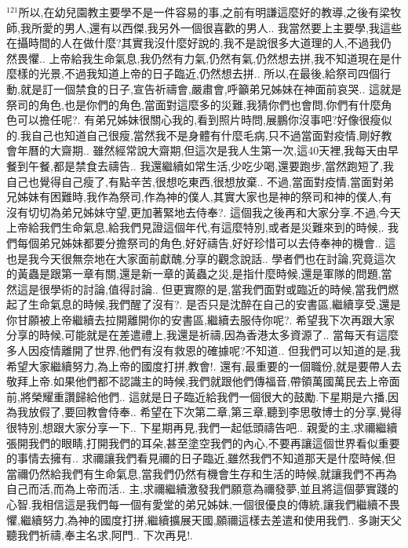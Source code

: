 \documentclass{book}
\begin{document}
$^{121}$所以,在幼兒園教主要學不是一件容易的事,之前有明謙這麼好的教導,之後有梁牧師,我所愛的男人,還有以西傑,我另外一個很喜歡的男人..
我當然要上主要學,我這些在攝時間的人在做什麼?其實我沒什麼好說的,我不是說很多大道理的人,不過我仍然畏懼..
上帝給我生命氣息,我仍然有力氣,仍然有氣,仍然想去拼,我不知道現在是什麼樣的光景,不過我知道上帝的日子臨近,仍然想去拼..
所以,在最後,給祭司四個行動,就是訂一個禁食的日子,宣告祈禱會,嚴肅會,呼籲弟兄姊妹在神面前哀哭..
這就是祭司的角色,也是你們的角色,當面對這麼多的災難,我猜你們也會問,你們有什麼角色可以擔任呢?.
有弟兄姊妹很關心我的,看到照片時問,展鵬你沒事吧?好像很瘦似的.我自己也知道自己很瘦,當然我不是身體有什麼毛病,只不過當面對疫情,剛好教會年曆的大齋期..
雖然經常說大齋期,但這次是我人生第一次,這40天裡,我每天由早餐到午餐,都是禁食去禱告..
我還繼續如常生活,少吃少喝,還要跑步,當然跑短了,我自己也覺得自己瘦了,有點辛苦,很想吃東西,很想放棄..
不過,當面對疫情,當面對弟兄姊妹有困難時,我作為祭司,作為神的僕人,其實大家也是神的祭司和神的僕人,有沒有切切為弟兄姊妹守望,更加著緊地去侍奉?.
這個我之後再和大家分享.不過,今天上帝給我們生命氣息,給我們見證這個年代,有這麼特別,或者是災難來到的時候,.
我們每個弟兄姊妹都要分擔祭司的角色,好好禱告,好好珍惜可以去侍奉神的機會..
這也是我今天很無奈地在大家面前獻醜,分享的觀念說話..
學者們也在討論,究竟這次的黃蟲是跟第一章有關,還是新一章的黃蟲之災,是指什麼時候,還是軍隊的問題,當然這是很學術的討論,值得討論..
但更實際的是,當我們面對或臨近的時候,當我們燃起了生命氣息的時候,我們醒了沒有?.
是否只是沈醉在自己的安書區,繼續享受,還是你甘願被上帝繼續去拉開離開你的安書區,繼續去服侍你呢?.
希望我下次再跟大家分享的時候,可能就是在差遣禮上,我還是祈禱,因為香港太多資源了..
當每天有這麼多人因疫情離開了世界,他們有沒有救恩的確據呢?不知道..
但我們可以知道的是,我希望大家繼續努力,為上帝的國度打拼,教會!.
還有,最重要的一個職份,就是要帶人去敬拜上帝.如果他們都不認識主的時候,我們就跟他們傳福音,帶領萬國萬民去上帝面前,將榮耀重讚歸給他們..
這就是日子臨近給我們一個很大的鼓勵.下星期是六播,因為我放假了,要回教會侍奉..
希望在下次第二章,第三章,聽到李思敬博士的分享,覺得很特別,想跟大家分享一下..
下星期再見,我們一起低頭禱告吧..
親愛的主,求禰繼續張開我們的眼睛,打開我們的耳朵,甚至塗空我們的內心,不要再讓這個世界看似重要的事情去擁有..
求禰讓我們看見禰的日子臨近,雖然我們不知道那天是什麼時候,但當禰仍然給我們有生命氣息,當我們仍然有機會生存和生活的時候,就讓我們不再為自己而活,而為上帝而活..
主,求禰繼續激發我們願意為禰發夢,並且將這個夢實踐的心智.我相信這是我們每一個有愛堂的弟兄姊妹,一個很優良的傳統,讓我們繼續不畏懼,繼續努力,為神的國度打拼,繼續擴展天國,願禰這樣去差遣和使用我們..
多謝天父聽我們祈禱,奉主名求,阿門..
下次再見!.
\newpage
\end{document}
